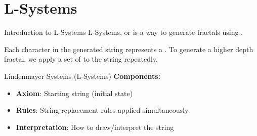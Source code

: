 \section{L-Systems}

\begin{frame}{Introduction to L-Systems}
  L-Systems, or  is a way to generate fractals using .

  Each character in the generated string represents a . To generate a higher depth fractal,
  we apply a set of  to the string repeatedly.

  \vspace{0.3cm}
  \begin{mathbox}{Lindenmayer Systems (L-Systems)}
    \textbf{Components:}
    \begin{itemize}
      \item \textbf{Axiom}: Starting string (initial state)
      \item \textbf{Rules}: String replacement rules applied simultaneously
      \item \textbf{Interpretation}: How to draw/interpret the string
    \end{itemize}
  \end{mathbox}
\end{frame}

